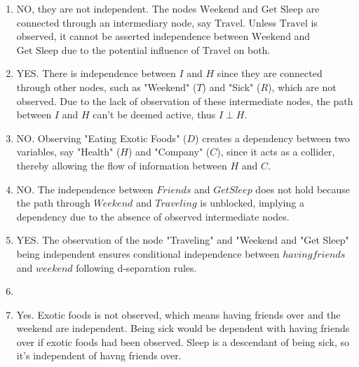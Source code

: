 \documentclass[submit]{harvardml}
\begin{document}
\begin{enumerate}
  \item NO, they are not independent. The nodes \( \text{Weekend} \) and \( \text{Get Sleep} \) are connected through an intermediary node, say \( \text{Travel} \). Unless \( \text{Travel} \) is observed, it cannot be asserted independence between \( \text{Weekend} \) and \( \text{Get Sleep} \) due to the potential influence of \( \text{Travel} \) on both.
  \item YES. There is independence between \( I \) and \( H \) since they are connected through other nodes, such as "Weekend" (\( T \)) and "Sick" (\( R \)), which are not observed. Due to the lack of observation of these intermediate nodes, the path between \( I \) and \( H \) can't be deemed active, thus \( I \perp H \).
  \item NO. Observing "Eating Exotic Foods" (\( D \)) creates a dependency between two variables, say "Health" (\( H \)) and "Company" (\( C \)), since it acts as a collider, thereby allowing the flow of information between \( H \) and \( C \).
  \item NO. The independence between \( Friends \) and \( Get Sleep \) does not hold because the path through \( Weekend \) and \( Traveling \) is unblocked, implying a dependency due to the absence of observed intermediate nodes.
  \item YES. The observation of the node "Traveling" and "Weekend and "Get Sleep" being independent ensures conditional independence between \( having friends \) and \( weekend \) following d-separation rules.
  \item
  \item Yes. Exotic foods is not observed, which means having friends over and the weekend are independent. Being sick would be dependent with having friends over if exotic foods had been observed. Sleep is a descendant of being sick, so it's independent of havng friends over. 
\end{enumerate}
\end{document}
